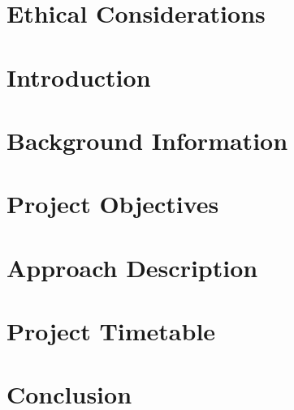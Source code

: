 \documentclass[12pt]{article}
\begin{document}
\pagebreak

\section*{Ethical Considerations}


\pagebreak

\tableofcontents

\pagebreak


\section{Introduction}
\label{intro}


\section{Background Information}
\label{bi}


\section{Project Objectives}
\label{obj}


\section{Approach Description}
\label{apr}


\section{Project Timetable}
\label{time}


\section{Conclusion}
\label{conc}



\newpage


\end{document}
